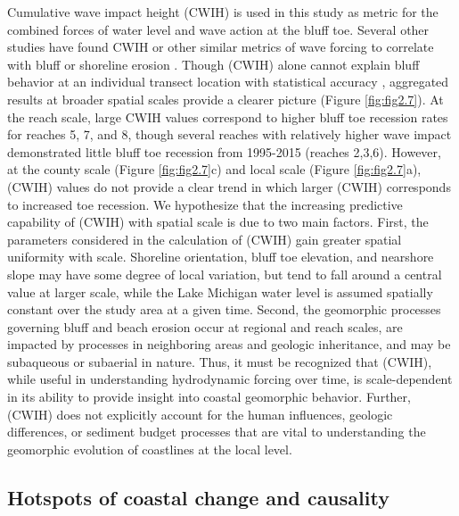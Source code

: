 Cumulative wave impact height (CWIH) is used in this study as metric for the
combined forces of water level and wave action at the bluff toe. Several other
studies have found CWIH or other similar metrics of wave forcing to correlate
with bluff or shoreline erosion
\citep{ruggiero_wave_2001,brown_factors_2005,lin_field_2014}. Though (CWIH)
alone cannot explain bluff behavior at an individual transect location with
statistical accuracy \citep{swenson_bluff_2006}, aggregated results at broader
spatial scales provide a clearer picture (Figure \ref{fig:fig2.7}).  At the
reach scale, large CWIH values correspond to higher bluff toe recession rates
for reaches 5, 7, and 8, though several reaches with relatively higher wave
impact demonstrated little bluff toe recession from 1995-2015 (reaches 2,3,6).
However, at the county scale (Figure \ref{fig:fig2.7}c) and local scale (Figure
\ref{fig:fig2.7}a), (CWIH) values do not provide a clear trend in which larger
(CWIH) corresponds to increased toe recession.  We hypothesize that the
increasing predictive capability of (CWIH) with spatial scale is due to two main
factors. First, the parameters considered in the calculation of (CWIH) gain
greater spatial uniformity with scale. Shoreline orientation, bluff toe
elevation, and nearshore slope may have some degree of local variation, but tend
to fall around a central value at larger scale, while the Lake Michigan water
level is assumed spatially constant over the study area at a given time. Second,
the geomorphic processes governing bluff and beach erosion occur at regional and
reach scales, are impacted by processes in neighboring areas and geologic
inheritance, and may be subaqueous or subaerial in nature. Thus, it must be
recognized that (CWIH), while useful in understanding hydrodynamic forcing over
time, is scale-dependent in its ability to provide insight into coastal
geomorphic behavior. Further, (CWIH) does not explicitly account for the human
influences, geologic differences, or sediment budget processes that are vital to
understanding the geomorphic evolution of coastlines at the local level.  


\subsection{Hotspots of coastal change and causality} 
\label{Hotspots of coastal change and causality} 

